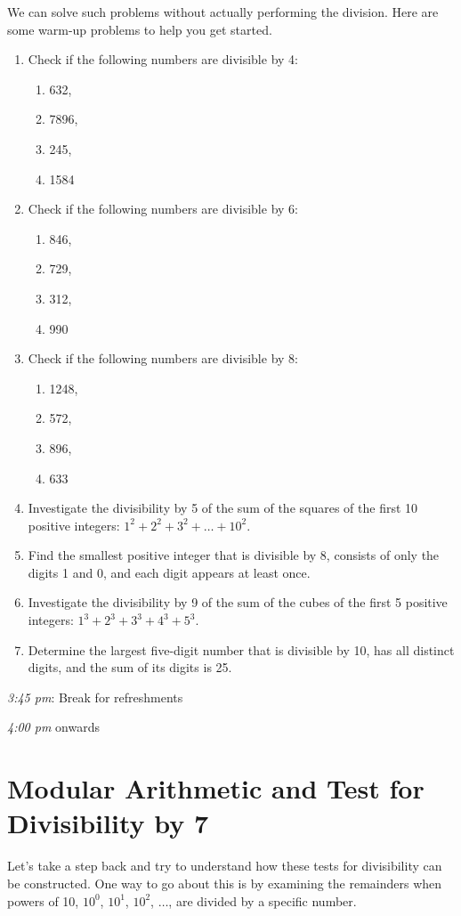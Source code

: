\documentclass[a4paper,12pt]{article}
\begin{document}
We can solve such problems without actually performing the division. Here are some warm-up problems to help you get started.
\begin{enumerate}
    \item Check if the following numbers are divisible by 4:
    \begin{enumerate}
        \item 632,
        \item 7896,
        \item 245,
        \item 1584
    \end{enumerate}
    \item Check if the following numbers are divisible by 6:
    \begin{enumerate}
        \item 846,
        \item 729,
        \item 312,
        \item 990
    \end{enumerate}
    \item Check if the following numbers are divisible by 8:
        \begin{enumerate}
            \item 1248,
            \item 572,
            \item 896,
            \item 633
        \end{enumerate}
    \item Investigate the divisibility by 5 of the sum of the squares of the first 10 positive integers: $1^2 + 2^2 + 3^2 + \ldots + 10^2$.
    \item Find the smallest positive integer that is divisible by 8, consists of only the digits 1 and 0, and each digit appears at least once.
    \item Investigate the divisibility by 9 of the sum of the cubes of the first 5 positive integers: $1^3 + 2^3 + 3^3 + 4^3 + 5^3$.
    \item Determine the largest five-digit number that is divisible by 10, has all distinct digits, and the sum of its digits is 25.
\end{enumerate}

\emph{3:45 pm}: Break for refreshments

\emph{4:00 pm} onwards
\section*{Modular Arithmetic and Test for Divisibility by 7}
Let's take a step back and try to understand how these tests for divisibility can be constructed. One way to go about this is by examining the remainders when powers of 10, $10^0$, $10^1$, $10^2$, $\ldots$, are divided by a specific number.
\end{document}
